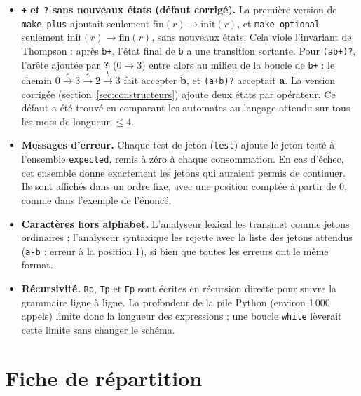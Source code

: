 \documentclass[12pt,a4paper]{article}
\newcommand{\code}[1]{{\fontsize{10}{12}\selectfont\texttt{#1}}}
\newcommand{\tok}[1]{\ensuremath{\text{\fontsize{10}{12}\selectfont\ttfamily #1}}}
\begin{document}
\begin{itemize}
\item \textbf{\texttt{+} et \texttt{?} sans nouveaux états (défaut corrigé).} La première
  version de \code{make\_plus} ajoutait seulement $\mathrm{fin}(r) \to \mathrm{init}(r)$, et
  \code{make\_optional} seulement $\mathrm{init}(r) \to \mathrm{fin}(r)$, sans nouveaux états.
  Cela viole l'invariant de Thompson : après \code{b+}, l'état final de \code{b} a une
  transition sortante. Pour \code{(ab+)?}, l'arête ajoutée par \tok{?} ($0 \to 3$) entre alors
  au milieu de la boucle de \code{b+} : le chemin
  $0 \xrightarrow{\varepsilon} 3 \xrightarrow{\varepsilon} 2 \xrightarrow{b} 3$ fait accepter
  \textbf{b}, et \code{(a+b)?} acceptait \textbf{a}. La version corrigée
  (section~\ref{sec:constructeurs}) ajoute deux états par opérateur. Ce défaut a été trouvé en
  comparant les automates au langage attendu sur tous les mots de longueur $\le 4$.
\item \textbf{Messages d'erreur.} Chaque test de jeton (\code{test}) ajoute le jeton testé à
  l'ensemble \code{expected}, remis à zéro à chaque consommation. En cas d'échec, cet ensemble
  donne exactement les jetons qui auraient permis de continuer. Ils sont affichés dans un ordre
  fixe, avec une position comptée à partir de 0, comme dans l'exemple de l'énoncé.
\item \textbf{Caractères hors alphabet.} L'analyseur lexical les transmet comme jetons
  ordinaires ; l'analyseur syntaxique les rejette avec la liste des jetons attendus
  (\code{a-b} : erreur à la position 1), si bien que toutes les erreurs ont le même format.
\item \textbf{Récursivité.} \code{Rp}, \code{Tp} et \code{Fp} sont écrites en récursion directe
  pour suivre la grammaire ligne à ligne. La profondeur de la pile Python (environ 1\,000
  appels) limite donc la longueur des expressions ; une boucle \code{while} lèverait cette
  limite sans changer le schéma.
\end{itemize}

\section{Fiche de répartition}
\end{document}
